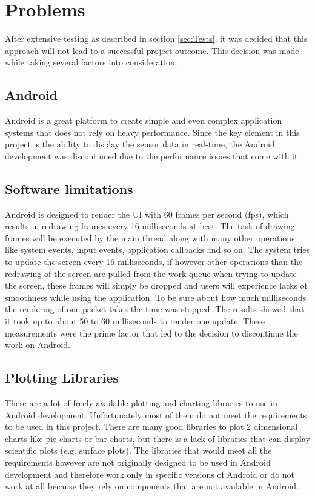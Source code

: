 \chapter{Problems}
\label{ch:Problems}

\author{Nico Leidenfrost}
%
After extensive testing as described in section \ref{sec:Tests}, it was decided that this approach will not lead to a successful project outcome. This decision was made while taking several factors into consideration.

\section{Android}
Android is a great platform to create simple and even complex application systems that does not rely on heavy performance. Since the key element in this project is the ability to display the sensor data in real-time, the Android development was discontinued due to the performance issues that come with it.

\section{Software limitations}
Android is designed to render the UI with 60 frames per second (fps), which results in redrawing frames every 16 milliseconds at best. The task of drawing frames will be executed by the main thread along with many other operations like system events, input events, application callbacks and so on. The system tries to update the screen every 16 milliseconds, if however other operations than the redrawing of the screen are pulled from the work queue when trying to update the screen, these frames will simply be dropped and users will experience lacks of smoothness while using the application. To be sure about how much milliseconds the rendering of one packet takes the time was stopped. The results showed that it took up to about 50 to 60 milliseconds to render one update. These measurements were the prime factor that led to the decision to discontinue the work on Android.

\section{Plotting Libraries}
There are a lot of freely available plotting and charting libraries to use in Android development. Unfortunately most of them do not meet the requirements to be used in this project. There are many good libraries to plot 2 dimensional charts like pie charts or bar charts, but there is a lack of libraries that can display scientific plots (e.g. surface plots). The libraries that would meet all the requirements however are not originally designed to be used in Android development and therefore work only in specific versions of Android or do not work at all because they rely on components that are not available in Android.

